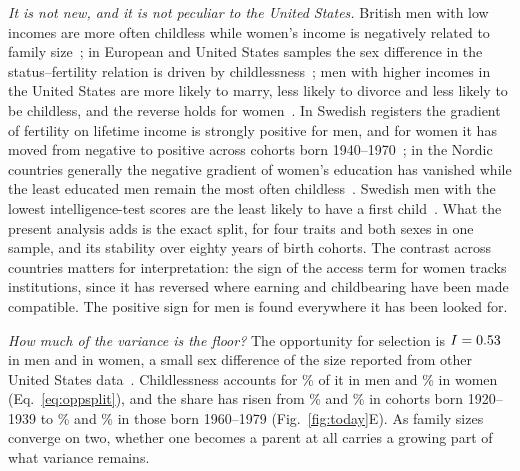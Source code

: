 \emph{It is not new, and it is not peculiar to the United States.} British men with low incomes are more often childless
while women's income is negatively related to family size~\cite{nettle2008}; in European and United States samples the sex
difference in the status--fertility relation is driven by childlessness~\cite{fieder2007,barthold2012,hopcroft2006,weeden2006}; men
with higher incomes in the United States are more likely to marry, less likely to divorce and less likely to be
childless, and the reverse holds for women~\cite{hopcroft2021}. In Swedish registers the gradient of fertility on lifetime income is
strongly positive for men, and for women it has moved from negative to positive across cohorts born 1940--1970~\cite{kolk2023};
in the Nordic countries generally the negative gradient of women's education has vanished while the least educated men
remain the most often childless~\cite{jalovaara2019}. Swedish men with the lowest intelligence-test scores are the least likely
to have a first child~\cite{kolk2019}. What the present analysis adds is the exact split, for four traits and both sexes in one
sample, and its stability over eighty years of birth cohorts. The contrast across countries matters for interpretation: the
sign of the access term for women tracks institutions, since it has reversed where earning and childbearing have been made compatible. The
positive sign for men is found everywhere it has been looked for.

\emph{How much of the variance is the floor?} The opportunity for selection is $I=0.53$ in men and \GssIW{} in women, a small
sex difference of the size reported from other United States data~\cite{jokela2010}. Childlessness accounts for \GssShareM\% of it in
men and \GssShareW\% in women (Eq.~\ref{eq:oppsplit}), and the share has risen from \GssShareMOld\% and \GssShareWOld\% in cohorts
born 1920--1939 to \GssShareMNew\% and \GssShareWNew\% in those born 1960--1979 (Fig.~\ref{fig:today}E). As family sizes converge
on two, whether one becomes a parent at all carries a growing part of what variance remains.

